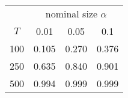 % 
\begin{tabular}{cccc}
  \hline
  & \multicolumn{3}{c}{nominal size $\alpha$} \\
 $T$ & 0.01 & 0.05 & 0.1 \\
 \hline
100 & 0.105 & 0.270 & 0.376 \\ 
  250 & 0.635 & 0.840 & 0.901 \\ 
  500 & 0.994 & 0.999 & 0.999 \\ 
   \hline
\end{tabular}
